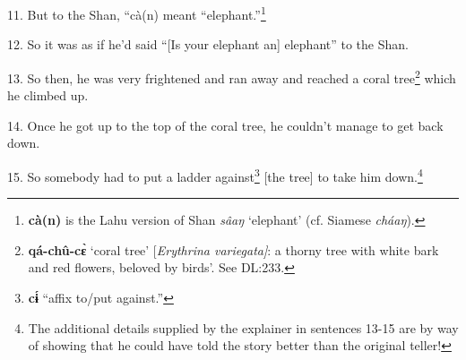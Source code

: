 11. But to the Shan, ``cà(n) meant ``elephant.''\footnote{\textbf{cà(n)} is the Lahu version of Shan \textit{sâaŋ} `elephant' (cf. Siamese \textit{cháaŋ}).}

12. So it was as if he'd said ``[Is your elephant an] elephant''
to the Shan.

13. So then, he was very frightened and ran away and reached a coral tree\footnote{\textbf{qá-chû-cɛ̀} `coral tree' [\textit{Erythrina variegata]}: a thorny tree with white bark and red flowers, beloved by birds'. See DL:233.}
which he climbed up.

14. Once he got up to the top of the coral tree, he couldn't manage to get back
down.

15. So somebody had to put a ladder against\footnote{\textbf{cɨ́} ``affix to/put against.''} [the tree] to take him down.\footnote{The additional details supplied by the explainer in sentences 13-15 are by way of showing that he could have told the story better than the original teller!}

